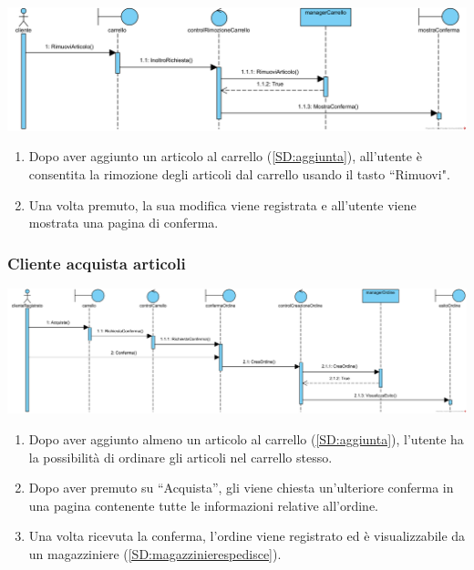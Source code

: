 \documentclass[12pt]{article}
\begin{document}
\begin{center}
\includegraphics[width=\textwidth]{SequenceDiagram/ClienteCarrelloRimuove}
\end{center}

\begin{enumerate}
\item Dopo aver aggiunto un articolo al carrello (\ref{SD:aggiunta}), all'utente è consentita la rimozione degli articoli dal carrello usando il tasto ``Rimuovi".
\item Una volta premuto, la sua modifica viene registrata e all'utente viene mostrata una pagina di conferma.
\end{enumerate}

\newpage

\subsubsection{Cliente acquista articoli}
\label{SD:acquista}

\begin{center}
\includegraphics[width=\textwidth]{SequenceDiagram/ClienteArticoloAcquista}
\end{center}

\begin{enumerate}
\item Dopo aver aggiunto almeno un articolo al carrello (\ref{SD:aggiunta}), l'utente ha la possibilità di ordinare gli articoli nel carrello stesso.
\item Dopo aver premuto su ``Acquista'', gli viene chiesta un'ulteriore conferma in una pagina contenente tutte le informazioni relative all'ordine.
\item Una volta ricevuta la conferma, l'ordine viene registrato ed è visualizzabile da un magazziniere  (\ref{SD:magazzinierespedisce}).
\end{enumerate}
\end{document}
